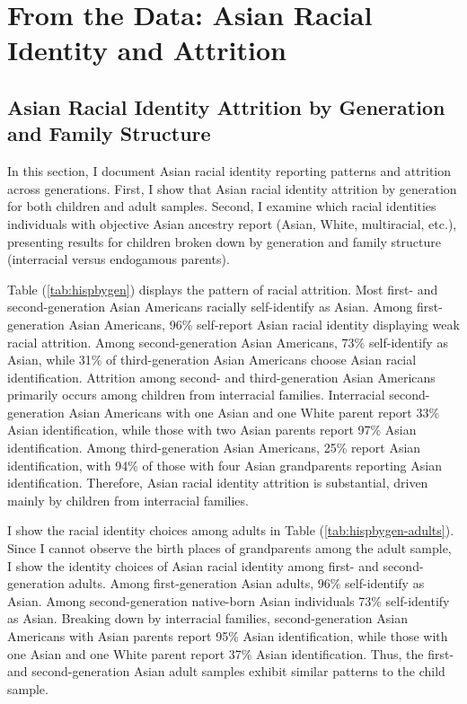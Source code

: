 \section{From the Data: Asian Racial Identity and Attrition}\label{sec:attrition}

\subsection{Asian Racial Identity Attrition by Generation and Family Structure}

In this section, I document Asian racial identity reporting patterns and attrition across generations. First, I show that Asian racial identity attrition by generation for both children and adult samples. Second, I examine which racial identities individuals with objective Asian ancestry report (Asian, White, multiracial, etc.), presenting results for children broken down by generation and family structure (interracial versus endogamous parents).

Table (\ref{tab:hispbygen}) displays the pattern of racial attrition. Most first- and second-generation Asian Americans racially self-identify as Asian. Among first-generation Asian Americans, 96\% self-report Asian racial identity displaying weak racial attrition. Among second-generation Asian Americans, 73\% self-identify as Asian, while 31\% of third-generation Asian Americans choose Asian racial identification. Attrition among second- and third-generation Asian Americans primarily occurs among children from interracial families. Interracial second-generation Asian Americans with one Asian and one White parent report 33\% Asian identification, while those with two Asian parents report 97\% Asian identification. Among third-generation Asian Americans, 25\% report Asian identification, with 94\% of those with four Asian grandparents reporting Asian identification. Therefore, Asian racial identity attrition is substantial, driven mainly by children from interracial families.

I show the racial identity choices among adults in Table (\ref{tab:hispbygen-adults}). Since I cannot observe the birth places of grandparents among the adult sample, I show the identity choices of Asian racial identity among first- and second-generation adults. Among first-generation Asian adults, 96\% self-identify as Asian. Among second-generation native-born Asian individuals 73\%  self-identify as Asian. Breaking down by interracial families, second-generation Asian Americans with Asian parents report 95\% Asian identification, while those with one Asian and one White parent report 37\% Asian identification. Thus, the first- and second-generation Asian adult samples exhibit similar patterns to the child sample.

